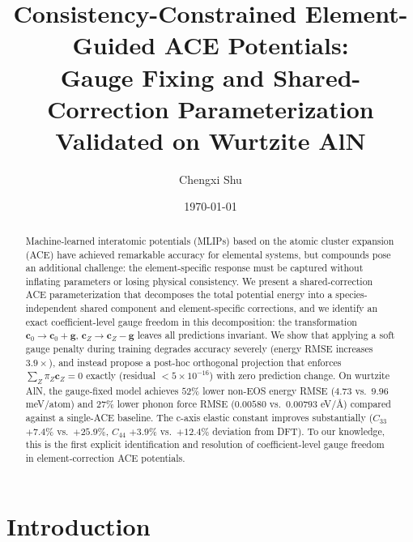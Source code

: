 \documentclass[twoside,prb,aps,floatfix,superscriptaddress,longbibliography]{revtex4-2}
\begin{document}
\title{Consistency-Constrained Element-Guided ACE Potentials: \\
Gauge Fixing and Shared-Correction Parameterization \\
Validated on Wurtzite AlN}

\author{Chengxi Shu}

\date{\today}

\begin{abstract}
Machine-learned interatomic potentials (MLIPs) based on the atomic cluster expansion (ACE) have achieved remarkable accuracy for elemental systems, but compounds pose an additional challenge: the element-specific response must be captured without inflating parameters or losing physical consistency. We present a shared-correction ACE parameterization that decomposes the total potential energy into a species-independent shared component and element-specific corrections, and we identify an exact coefficient-level gauge freedom in this decomposition: the transformation $\mathbf{c}_0 \to \mathbf{c}_0 + \mathbf{g}$, $\mathbf{c}_Z \to \mathbf{c}_Z - \mathbf{g}$ leaves all predictions invariant. We show that applying a soft gauge penalty during training degrades accuracy severely (energy RMSE increases $3.9\times$), and instead propose a post-hoc orthogonal projection that enforces $\sum_Z \pi_Z \mathbf{c}_Z = 0$ exactly (residual $< 5\times10^{-16}$) with zero prediction change. On wurtzite AlN, the gauge-fixed model achieves $52\%$ lower non-EOS energy RMSE ($4.73$ vs.\ $9.96$ meV/atom) and $27\%$ lower phonon force RMSE ($0.00580$ vs.\ $0.00793$ eV/{\AA}) compared against a single-ACE baseline. The c-axis elastic constant improves substantially ($C_{33}$ $+7.4\%$ vs.\ $+25.9\%$, $C_{44}$ $+3.9\%$ vs.\ $+12.4\%$ deviation from DFT). To our knowledge, this is the first explicit identification and resolution of coefficient-level gauge freedom in element-correction ACE potentials.
\end{abstract}

\maketitle

\section{Introduction}
\label{sec:intro}
\end{document}
